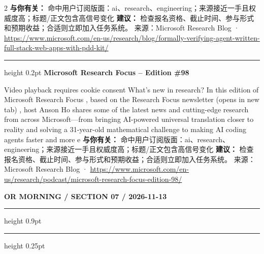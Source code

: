 \documentclass[10.5pt]{ctexart}
\begin{document}
\begin{multicols}{2}
\textbf{与你有关：} 命中用户订阅版面：ai、research、engineering；来源接近一手且权威度高；标题/正文包含高信号变化
\textbf{建议：} 检查报名资格、截止时间、参与形式和预期收益；合适则立即加入任务系统。
{\footnotesize\color{ormuted} 来源：Microsoft Research Blog · \url{https://www.microsoft.com/en-us/research/blog/formally-verifying-agent-written-full-stack-web-apps-with-pdd-kit/}}
\vspace{2mm}
\hrule height 0.2pt
\vspace{2mm}
{\large\bfseries Microsoft Research Focus – Edition \#98}\par
Video playback requires cookie consent What’s new in research? In this edition of Microsoft Research Focus , based on the Research Focus newsletter (opens in new tab) , host Anson Ho shares some of the latest news and cutting-edge research from across Microsoft—from bringing AI-powered universal translation closer to reality and solving a 31-year-old mathematical challenge to making AI coding agents faster and more e
\textbf{与你有关：} 命中用户订阅版面：ai、research、engineering；来源接近一手且权威度高；标题/正文包含高信号变化
\textbf{建议：} 检查报名资格、截止时间、参与形式和预期收益；合适则立即加入任务系统。
{\footnotesize\color{ormuted} 来源：Microsoft Research Blog · \url{https://www.microsoft.com/en-us/research/podcast/microsoft-research-focus-edition-98/}}
\end{multicols}
\newpage
{\small\bfseries OR MORNING / SECTION 07 / 2026-11-13}
\vspace{2mm}
\hrule height 0.9pt
\vspace{1.5mm}
\hrule height 0.25pt
\vspace{4mm}
\end{document}
